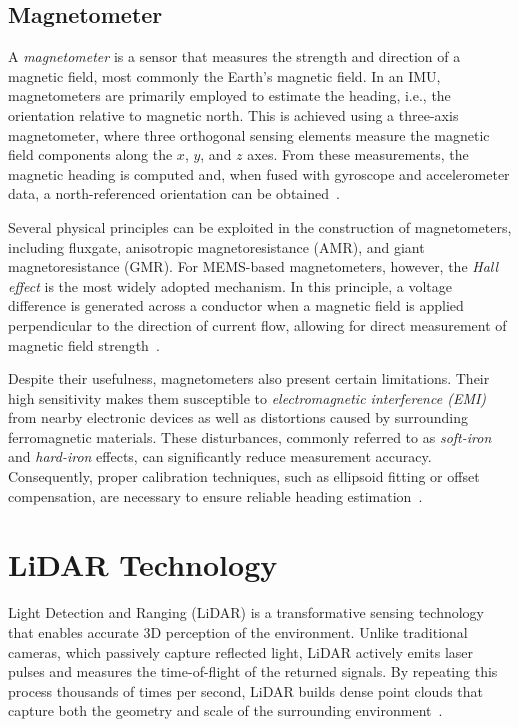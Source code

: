 \documentclass[english, bachelor, utf8]{base/thesis_telematics}
\begin{document}
\subsection{Magnetometer}

A \textit{magnetometer} is a sensor that measures the strength and direction of a magnetic field, most commonly the Earth's magnetic field.
In an IMU, magnetometers are primarily employed to estimate the heading, i.e., the orientation relative to magnetic north. 
This is achieved using a three-axis magnetometer, where three orthogonal sensing elements measure the magnetic field components along the $x$, $y$, and $z$ axes. 
From these measurements, the magnetic heading is computed and, when fused with gyroscope and accelerometer data, a north-referenced orientation can be obtained~\cite{advnav_imu_intro}.  

Several physical principles can be exploited in the construction of magnetometers, including fluxgate, anisotropic magnetoresistance (AMR), and giant magnetoresistance (GMR). 
For MEMS-based magnetometers, however, the \textit{Hall effect} is the most widely adopted mechanism. In this principle, a voltage difference is generated across a conductor when a magnetic field is applied perpendicular to the direction of current flow, allowing for direct measurement of magnetic field strength~\cite{howtomechatronics}.  

Despite their usefulness, magnetometers also present certain limitations. Their high sensitivity makes them susceptible to \textit{electromagnetic interference (EMI)} from nearby electronic devices as well as distortions caused by surrounding ferromagnetic materials. 
These disturbances, commonly referred to as \textit{soft-iron} and \textit{hard-iron} effects, can significantly reduce measurement accuracy. Consequently, proper calibration techniques, such as ellipsoid fitting or offset compensation, are necessary to ensure reliable heading estimation~\cite{vectornav_mems_operation}.

\section{LiDAR Technology}
Light Detection and Ranging (LiDAR) is a transformative sensing technology that enables accurate 3D perception of the environment. 
Unlike traditional cameras, which passively capture reflected light, LiDAR actively emits laser pulses and measures the time-of-flight of the returned signals. 
By repeating this process thousands of times per second, LiDAR builds dense point clouds that capture both the geometry and scale of the surrounding environment~\cite{neon_lidar_basics}.
\end{document}
